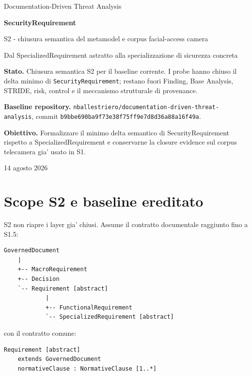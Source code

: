 \documentclass[11pt,a4paper]{article}
\begin{document}
\begin{titlepage}
\centering
\vspace*{1.6cm}
{\Large Documentation-Driven Threat Analysis\par}
\vspace{0.8cm}
{\Huge\bfseries SecurityRequirement\par}
\vspace{0.30cm}
{\LARGE S2 - chiusura semantica del metamodel e corpus facial-access camera\par}
\vspace{0.9cm}
{\large Dal SpecializedRequirement astratto alla specializzazione di sicurezza concreta\par}
\vfill
\begin{minipage}{0.86\textwidth}
\small
\textbf{Stato.} Chiusura semantica S2 per il baseline corrente. I probe hanno chiuso il delta minimo di \texttt{SecurityRequirement}; restano fuori Finding, Base Analysis, STRIDE, risk, control e il meccanismo strutturale di provenance.

\medskip
\textbf{Baseline repository.} \texttt{nballestriero/documentation-driven-threat-analysis}, commit \texttt{b9bbe690ba9f73e38f75ff9e7d8d36a88a16f49a}.

\medskip
\textbf{Obiettivo.} Formalizzare il minimo delta semantico di SecurityRequirement rispetto a SpecializedRequirement e conservarne la closure evidence sul corpus telecamera gia' usato in S1.
\end{minipage}
\vfill
{\large 14 agosto 2026\par}
\end{titlepage}

\tableofcontents
\newpage

\section{Scope S2 e baseline ereditato}

S2 non riapre i layer gia' chiusi. Assume il contratto documentale raggiunto fino a S1.5:

\begin{lstlisting}
GovernedDocument
    |
    +-- MacroRequirement
    +-- Decision
    `-- Requirement [abstract]
            |
            +-- FunctionalRequirement
            `-- SpecializedRequirement [abstract]
\end{lstlisting}

con il contratto comune:

\begin{lstlisting}
Requirement [abstract]
    extends GovernedDocument
    normativeClause : NormativeClause [1..*]
\end{lstlisting}
\end{document}
